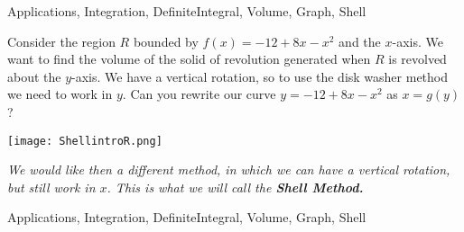 \begin{tagblock}{Applications, Integration, DefiniteIntegral, Volume, Graph, Shell}
\begin{question}
	


Consider the region $R$ bounded by $f(x) = -12+8x-x^2$ and the $x$-axis.  We want to find the volume of the  solid of revolution generated when $R$ is revolved about the $y$-axis.   We have a vertical rotation, so to use the disk washer method we need to work in $y$.  Can you rewrite our curve $y = -12+8x-x^2$ as $x=g(y)$?  

\texttt{[image: ShellintroR.png]}
 

\emph{We would like then a different method, in which we can have a vertical rotation, but still work in $x$.  This is what we will call the \textbf{Shell Method.}}




    
\begin{tags}
       Applications, Integration, DefiniteIntegral, Volume, Graph, Shell
\end{tags}
    
\begin{diary}
\end{diary}
	
\begin{solution}

\end{solution}
	
\end{question}

\end{tagblock}

